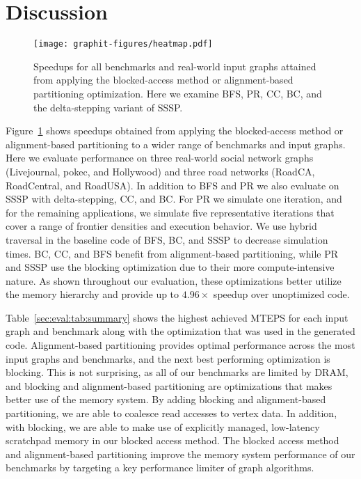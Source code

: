 \section{Discussion}\label{sec:discussion}


\begin{figure}[t!]
    \centering
    \texttt{[image: graphit-figures/heatmap.pdf]}
    \caption{Speedups for all benchmarks and real-world input graphs attained from applying the blocked-access method or alignment-based partitioning optimization. Here we examine BFS, PR, CC, BC, and the delta-stepping variant of SSSP.}
    \label{pap:generals:sec:eval:fig:heatmap}
\end{figure}

Figure~\ref{pap:generals:sec:eval:fig:heatmap} shows speedups obtained from applying the blocked-access method or alignment-based partitioning to a wider range of benchmarks and input graphs.
Here we evaluate performance on three real-world social network graphs (Livejournal, pokec, and Hollywood) and three road networks (RoadCA, RoadCentral, and RoadUSA).
In addition to BFS and PR we also evaluate on SSSP with delta-stepping, CC, and BC.
For PR we simulate one iteration, and for the remaining applications, we simulate five representative iterations that cover a range of frontier densities and execution behavior.
We use hybrid traversal in the baseline code of BFS, BC, and SSSP to decrease simulation times.
BC, CC, and BFS benefit from alignment-based partitioning, while PR and SSSP use the blocking optimization due to their more compute-intensive nature.
As shown throughout our evaluation, these optimizations better utilize the memory hierarchy and provide up to $4.96\times$ speedup over unoptimized code.

Table~\ref{sec:eval:tab:summary} shows the highest achieved MTEPS for each input graph and benchmark along with the optimization that was used in the generated code.
Alignment-based partitioning provides optimal performance across the most input graphs and benchmarks, and the next best performing optimization is blocking.
This is not surprising, as all of our benchmarks are limited by DRAM, and blocking and alignment-based partitioning are optimizations that makes better use of the memory system.
By adding blocking and alignment-based partitioning, we are able to coalesce read accesses to vertex data.
In addition, with blocking, we are able to make use of explicitly managed, low-latency scratchpad memory in our blocked access method. 
The blocked access method and alignment-based partitioning improve the memory system performance of our benchmarks by targeting a key performance limiter of graph algorithms.

